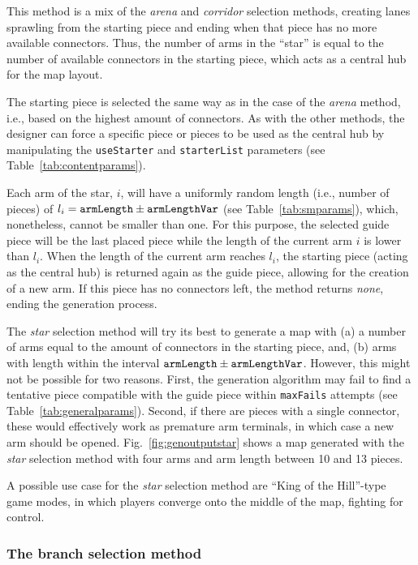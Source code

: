 \documentclass[journal]{IEEEtran}
\begin{document}
This method is a mix of the \emph{arena} and \emph{corridor} selection methods,
creating lanes sprawling from the starting piece and ending when that piece has no
more available connectors. Thus, the number of arms in the ``star'' is equal to the
number of available connectors in the starting piece, which acts as a central hub for
the map layout.

The starting piece is selected the same way as in the case of the
\emph{arena} method, i.e., based on the highest amount of connectors. As with the
other methods, the designer can force a specific piece or pieces to be used as the
central hub by manipulating the \texttt{useStarter} and \texttt{starterList} parameters
(see Table~\ref{tab:contentparams}).

Each arm of the star, $i$, will have a uniformly random length (i.e., number of pieces)
of $l_i=\text{\texttt{armLength}} \pm \text{\texttt{armLengthVar}}$ (see
Table~\ref{tab:smparams}), which, nonetheless, cannot be smaller than one. For this
purpose, the selected guide piece will be the last placed piece while the length of
the current arm $i$ is lower than $l_i$. When the length of the current arm reaches
$l_i$, the starting piece (acting as the central hub) is returned again as the guide
piece, allowing for the creation of a new arm. If this piece has no connectors left,
the method returns \textit{none}, ending the generation process.

The \emph{star} selection method will try its best to generate a map with (a) a
number of arms equal to the amount of connectors in the starting piece, and, (b)
arms with length within the interval $\text{\texttt{armLength}} \pm
\text{\texttt{armLengthVar}}$. However, this might not be possible for two reasons.
First, the generation algorithm may fail to find a tentative piece compatible with
the guide piece within \texttt{maxFails} attempts (see Table~\ref{tab:generalparams}).
Second, if there are pieces with a single connector, these would effectively work as
premature arm terminals, in which case a new arm should be opened.
Fig.~\ref{fig:genoutputstar} shows a map generated with the \emph{star} selection
method with four arms and arm length between 10 and 13 pieces.

A possible use case for the \textit{star} selection method are ``King of the Hill''-type
game modes, in which players converge onto the middle of the map, fighting for control.

\subsubsection{The branch selection method}
\label{sec:methods:selmethods:branch}
\end{document}
